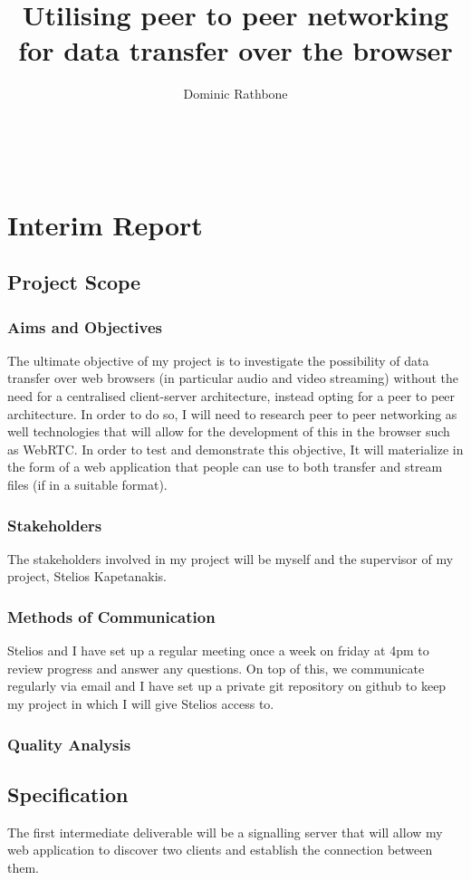 \documentclass[]{report}
\title{Utilising peer to peer networking for data transfer over the browser}
\author{Dominic Rathbone}
\begin{document}
\maketitle
\tableofcontents
\


\chapter*{Interim Report}
	\section{Project Scope}
		\subsection*{Aims and Objectives}
			The ultimate objective of my project is to investigate the possibility of data transfer over web browsers (in particular audio and video streaming) without the need for a centralised client-server architecture, instead opting for a peer to peer architecture. In order to do so, I will need to research peer to peer networking as well technologies that will allow for the development of this in the browser such as WebRTC. In order to test and demonstrate this objective, It will materialize in the form of a web application that people can use to both transfer and stream files (if in a suitable format).
		\subsection*{Stakeholders}
			The stakeholders involved in my project will be myself and the supervisor of my project, Stelios Kapetanakis.
		\subsection*{Methods of Communication}
			Stelios and I have set up a regular meeting once a week on friday at 4pm to review progress and answer any questions. On top of this, we communicate regularly via email and I have set up a private git repository on github to keep my project in which I will give Stelios access to.
		\subsection*{Quality Analysis}
		
	\section{Specification}
			The first intermediate deliverable will be a signalling server that will allow my web application to discover two clients and establish the connection between them.
	
\end{document}
